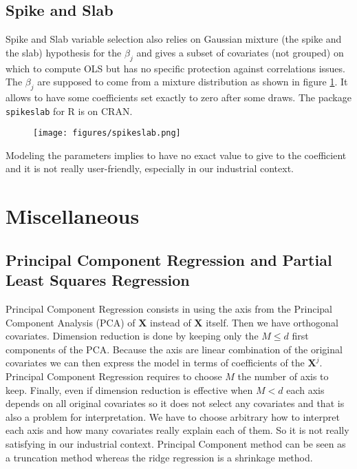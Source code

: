 \documentclass[12pt,a4paper]{report}
\begin{document}
		\subsection{Spike and Slab}			%

			Spike and Slab variable selection \cite{ishwaran2005spike} also relies on Gaussian mixture (the spike and the slab) hypothesis for the $\beta_j$ and gives a subset of covariates (not grouped) on which to compute \textsc{OLS} but has no specific protection against correlations issues.  The $\beta_j$ are supposed to come from a mixture distribution as shown in figure \ref{spikeslab}. It allows to have some coefficients set exactly to zero after some draws. The package {\tt spikeslab} for R is on CRAN. \\
			
\begin{figure}[h!]
	\centering
	\texttt{[image: figures/spikeslab.png]} 
	\caption{}\label{spikeslab}
\end{figure}		
		
		Modeling the parameters implies to have no exact value to give to the coefficient and it is not really user-friendly, especially in our industrial context. %
		
		\FloatBarrier
	\section{Miscellaneous}	
	\subsection{Principal Component Regression and Partial Least Squares Regression}
	Principal Component Regression \cite{jackson2005user} consists in using the axis from the Principal Component Analysis (PCA) of $\boldsymbol{X}$ instead of $\boldsymbol{X}$ itself. Then we have orthogonal covariates. Dimension reduction is done by keeping only the $M \leq d$ first components of the PCA. Because the axis are linear combination of the original covariates we can then express the model in terms of coefficients of the $\boldsymbol{X}^j$.\\
	
	Principal Component Regression requires to choose $M$ the number of axis to keep. Finally, even if dimension reduction is effective when $M<d$ each axis depends on all original covariates so it does not select any covariates and that is also a problem for interpretation. We have to choose arbitrary how to interpret each axis and how many covariates really explain each of them. So it is not really satisfying in our industrial context. Principal Component method can be seen as a truncation method whereas the ridge regression is a shrinkage method. \\
	
\end{document}
